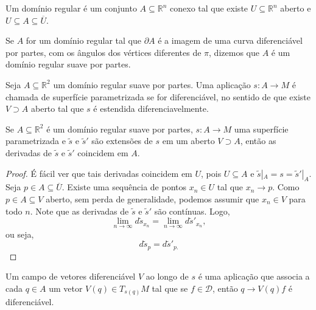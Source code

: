 \begin{definition}
    \label{def:dominio-regular}
    Um domínio regular é um conjunto $A \subseteq \mathbb{R}^{n}$ conexo tal que existe $U \subseteq \mathbb{R}^{n}$ aberto e $U\subseteq A\subseteq \overline{U}$.

    Se $A$ for um domínio regular tal que $\partial A$ é a imagem de uma curva diferenciável por partes, com os ângulos dos vértices diferentes de $\pi$, dizemos que $A$ é um domínio regular suave por partes.
\end{definition}
\begin{definition}
    \label{def:superficie-parametrizada}
    Seja $A\subseteq \mathbb{R}^{2}$ um domínio regular suave por partes. Uma aplicação $s:A\to M$ é chamada de superfície parametrizada se for diferenciável, no sentido de que existe $V\supset A$ aberto tal que $s$ é estendida diferenciavelmente.
\end{definition}
\begin{lemma}
    \label{lem:extensao-unica-por-partes}
    Se $A\subseteq \mathbb{R}^{2}$ é um domínio regular suave por partes, $s:A\to M$ uma superfície parametrizada e $\tilde{s}$ e $\tilde{s}'$ são extensões de $s$ em um aberto $V \supset A$, então as derivadas de $\tilde{s}$ e $\tilde{s}'$ coincidem em $A$.
    \begin{proof}

        É fácil ver que tais derivadas coincidem em $U$, pois $U \subseteq A$ e $\tilde{s}|_{A}=s=\tilde{s}'|_{A}$. Seja $p \in A\subseteq \overline{U}$. Existe uma sequência de pontos $x_{n}\in U$ tal que $x_{n}\to p$. Como $p \in A \subseteq V$ aberto, sem perda de generalidade, podemos assumir que $x_{n}\in V$ para todo $n$. Note que as derivadas de $\tilde{s}$ e $\tilde{s}'$ são contínuas. Logo,
        \begin{equation*}
            \lim_{ n \to \infty } d\tilde{s}_{x_{n}}=\lim_{ n \to \infty } d\tilde{s}'_{x_{n}},
        \end{equation*}
        ou seja,
        \begin{equation*}
            d\tilde{s}_{p}=d\tilde{s}'_{p.}
        \end{equation*}
    \end{proof}
\end{lemma}
Um campo de vetores diferenciável $V$ ao longo de $s$ é uma aplicação que associa a cada $q \in A$ um vetor $V(q)\in T_{s(q)}M$ tal que se $f \in \mathcal{D}$, então $q\to V(q)f$ é diferenciável.
